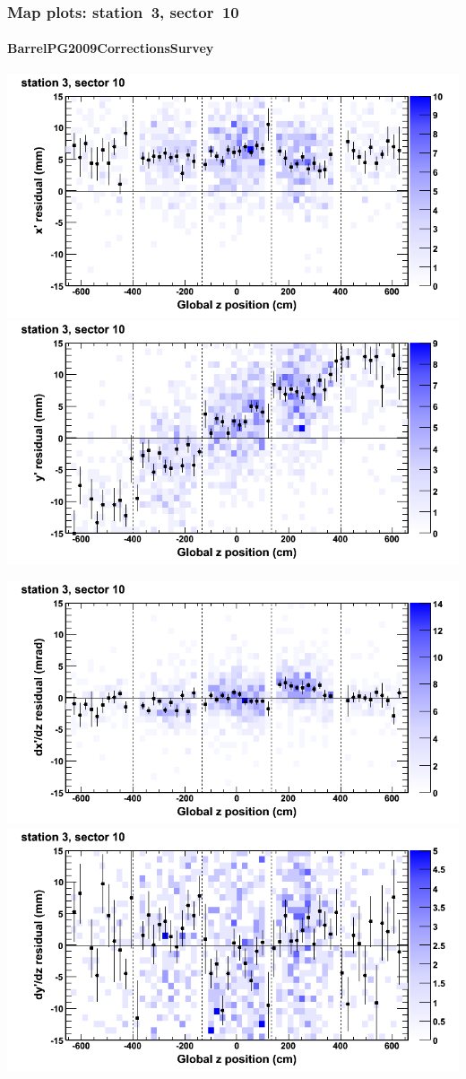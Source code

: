 \documentclass[compress]{beamer}
\begin{document}
\begin{frame}
\frametitle{Map plots: station~3, sector~10}
\framesubtitle{BarrelPG2009CorrectionsSurvey}
\includegraphics[width=0.5\linewidth]{mapplots_01/DTvsz_st3sec10_x.png}
\includegraphics[width=0.5\linewidth]{mapplots_01/DTvsz_st3sec10_y.png}

\includegraphics[width=0.5\linewidth]{mapplots_01/DTvsz_st3sec10_dxdz.png}
\includegraphics[width=0.5\linewidth]{mapplots_01/DTvsz_st3sec10_dydz.png}
\end{frame}
\end{document}
